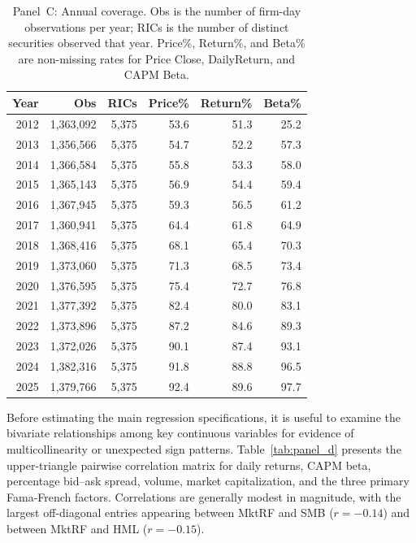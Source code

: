 \documentclass{article}
\theoremstyle{plain}
\begin{document}
\begin{table}[!ht]
\centering
\footnotesize
\begin{tabular}{r r r r r r}
\toprule
\textbf{Year} & \textbf{Obs} & \textbf{RICs} & \textbf{Price\%} & \textbf{Return\%} & \textbf{Beta\%} \\
\midrule
  2012 & 1,363,092 & 5,375 & 53.6 & 51.3 & 25.2 \\
  2013 & 1,356,566 & 5,375 & 54.7 & 52.2 & 57.3 \\
  2014 & 1,366,584 & 5,375 & 55.8 & 53.3 & 58.0 \\
  2015 & 1,365,143 & 5,375 & 56.9 & 54.4 & 59.4 \\
  2016 & 1,367,945 & 5,375 & 59.3 & 56.5 & 61.2 \\
  2017 & 1,360,941 & 5,375 & 64.4 & 61.8 & 64.9 \\
  2018 & 1,368,416 & 5,375 & 68.1 & 65.4 & 70.3 \\
  2019 & 1,373,060 & 5,375 & 71.3 & 68.5 & 73.4 \\
  2020 & 1,376,595 & 5,375 & 75.4 & 72.7 & 76.8 \\
  2021 & 1,377,392 & 5,375 & 82.4 & 80.0 & 83.1 \\
  2022 & 1,373,896 & 5,375 & 87.2 & 84.6 & 89.3 \\
  2023 & 1,372,026 & 5,375 & 90.1 & 87.4 & 93.1 \\
  2024 & 1,382,316 & 5,375 & 91.8 & 88.8 & 96.5 \\
  2025 & 1,379,766 & 5,375 & 92.4 & 89.6 & 97.7 \\
\bottomrule
\end{tabular}
\caption{Panel~C: Annual coverage. Obs is the number of firm-day observations per year; RICs is the number of distinct securities observed that year. Price\%, Return\%, and Beta\% are non-missing rates for Price Close, DailyReturn, and CAPM Beta.}
\label{tab:panel_c}
\end{table}

Before estimating the main regression specifications, it is useful to examine the bivariate relationships among key continuous variables for evidence of multicollinearity or unexpected sign patterns. Table~\ref{tab:panel_d} presents the upper-triangle pairwise correlation matrix for daily returns, CAPM beta, percentage bid--ask spread, volume, market capitalization, and the three primary Fama-French factors. Correlations are generally modest in magnitude, with the largest off-diagonal entries appearing between MktRF and SMB ($r = -0.14$) and between MktRF and HML ($r = -0.15$).
\end{document}
